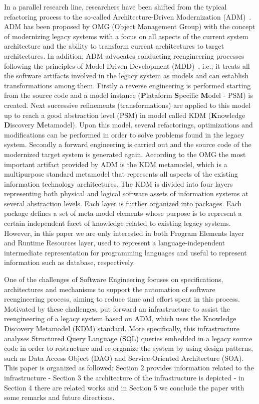 In a parallel research line, researchers have been shifted from the typical refactoring process to the so-called Architecture-Driven Modernization (ADM)~\cite{ADMBook}. ADM has been proposed by OMG (Object Management Group) with the concept of modernizing legacy systems with a focus on all aspects of the current system architecture and the ability to transform current architectures to target architectures. In addition, ADM advocates conducting reengineering processes following the principles of Model-Driven Development (MDD)~\cite{ADMBook}, i.e., it treats all the software artifacts involved in the legacy system as models and can establish transformations among them.  Firstly a reverse engineering is performed starting from the source code and a model instance (\textbf{P}lataform \textbf{S}pecific \textbf{M}odel - PSM) is created. Next successive refinements (transformations) are applied to this model up to reach a good abstraction level (PSM) in model called KDM (\textbf{K}nowledge \textbf{D}iscovery \textbf{M}etamodel). Upon this model, several refactorings, optimizations and modifications can be performed in order to solve problems found in the legacy system. Secondly a forward engineering is carried out and the source code of the modernized target system is generated again. According to the OMG the most important artifact provided by ADM is the KDM metamodel, which is a multipurpose standard metamodel that represents all aspects of the existing information  technology architectures. The KDM is divided into four layers representing both physical and logical software assets of information systems at several abstraction levels. Each layer is further organized into packages. Each package defines a set of meta-model elements whose purpose is to represent a certain independent facet of knowledge related to existing legacy systems.  However, in this paper we are only interested in both Program Elements layer and Runtime Resources layer, used to represent a language-independent intermediate representation for programming languages and useful to represent information such as database, respectively.

One of the challenges of Software Engineering focuses on specifications, architectures and mechanisms to support the automation of software reengineering process, aiming to reduce time and effort spent in this process.
 Motivated by these challenges, put forward an infrastructure to assist the reengineering of a legacy system based on ADM, which uses the Knowledge Discovery Metamodel (KDM) standard. 
More specifically, this infrastructure analyses Structured Query Language (SQL) queries embedded in a legacy source code in order to restructure and re-organize the system by using design patterns, such as Data Access Object (DAO) and Service-Oriented Architecture (SOA).  This paper is organized as followed: Section 2 provides information related to the infrastructure - Section 3 the architecture of the infrastructure is depicted - in Section 4 there are related works and in Section 5 we conclude the paper with some remarks and future directions.